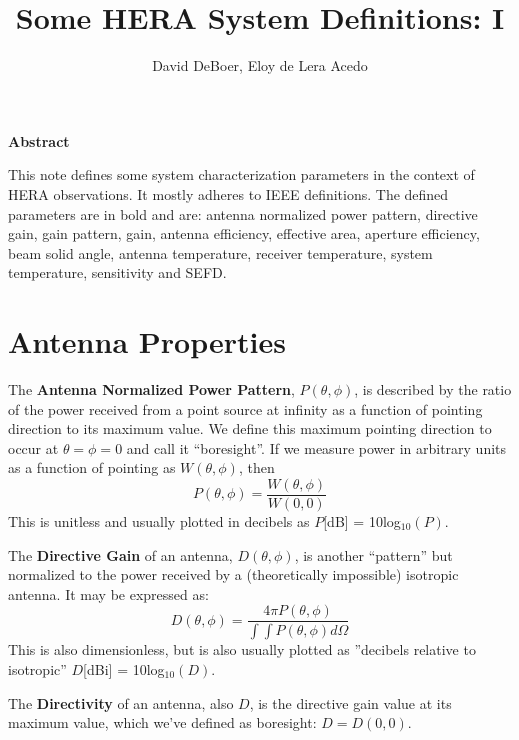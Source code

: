 \documentclass[11pt]{article}
\begin{document}
\title{Some HERA System Definitions: I}
\author{David DeBoer, Eloy de Lera Acedo}
\maketitle

\begin{center}
{\bf Abstract}
\end{center}

\small
\begin{adjustwidth}{1in}{1in}
This note defines some system characterization parameters in the context of HERA observations.  It mostly adheres to IEEE definitions.  The defined parameters are in bold and are: antenna normalized power pattern, directive gain, gain pattern, gain, antenna efficiency, effective area, aperture efficiency, beam solid angle, antenna temperature, receiver temperature, system temperature, sensitivity and SEFD.
\end{adjustwidth}

\section{Antenna Properties}
The {\bf Antenna Normalized Power Pattern}, $P(\theta,\phi)$, is described by the ratio of the power received from a point source at infinity as a function of pointing direction to its maximum value.  We define this maximum pointing direction to occur at $\theta = \phi = 0$ and call it ``boresight''.  If we measure power in arbitrary units as a function of pointing as $W(\theta,\phi)$, then
\begin{equation}
P(\theta,\phi) = \frac{W(\theta,\phi)}{W(0,0)}
\end{equation}
This is unitless and usually plotted in decibels as $P$[dB] = 10log$_{10}(P)$.

The {\bf Directive Gain} of an antenna, $D(\theta,\phi)$, is another ``pattern'' but normalized to the power received by a (theoretically impossible) isotropic antenna.  It may be expressed as:
\begin{equation}
D(\theta,\phi) = \frac{4\pi P(\theta,\phi)}{\int\int P(\theta,\phi)d\Omega}
\end{equation} 
This is also dimensionless, but is also usually plotted as ''decibels relative to isotropic'' $D$[dBi] = 10log$_{10}(D)$.

The {\bf Directivity} of an antenna, also $D$, is the directive gain value at its maximum value, which we've defined as boresight:  $D = D(0,0)$.
\end{document}
